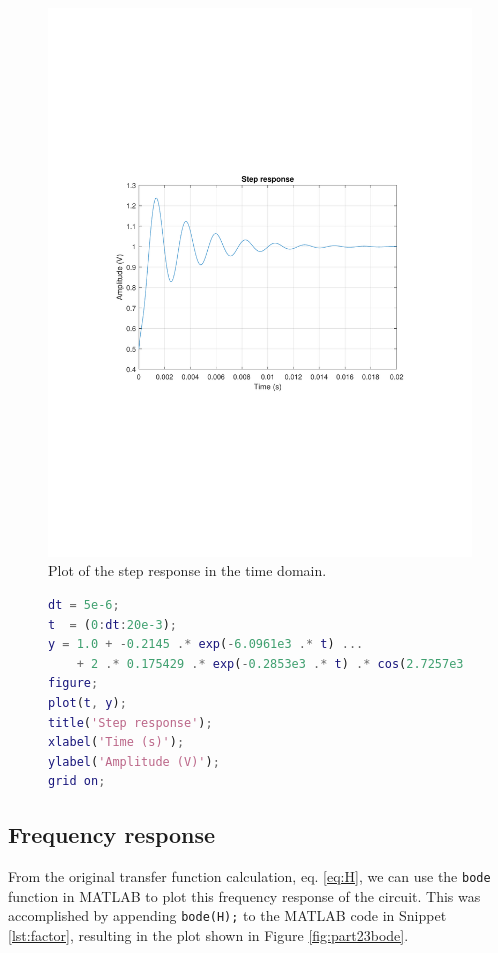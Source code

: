 \documentclass{homework}
\begin{document}
	\begin{figure}[H]
		\centering
		\includegraphics[width=0.7\linewidth,clip,trim=4cm 8.5cm 3cm 8.5cm]{part2_2step}
		\caption{Plot of the step response in the time domain.}
		\label{fig:part22step}
	\end{figure}
	\begin{figure}[H]
		\begin{lstlisting}[language=matlab, caption={MATLAB code for plotting the step response.},label={lst:stepplot}]
dt = 5e-6;
t  = (0:dt:20e-3);
y = 1.0 + -0.2145 .* exp(-6.0961e3 .* t) ...
    + 2 .* 0.175429 .* exp(-0.2853e3 .* t) .* cos(2.7257e3 .* t + deg2rad(144.489));
figure;
plot(t, y);
title('Step response');
xlabel('Time (s)');
ylabel('Amplitude (V)');
grid on;
		\end{lstlisting}
	\end{figure}

	\subsection{Frequency response}
	From the original transfer function calculation, eq. \eqref{eq:H}, we can use the \texttt{bode} function in MATLAB to plot this frequency response of the circuit. This was accomplished by appending \texttt{bode(H);} to the MATLAB code in Snippet \ref{lst:factor}, resulting in the plot shown in Figure \ref{fig:part23bode}.
	
\end{document}
